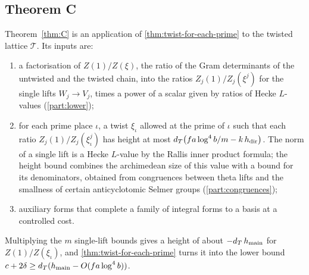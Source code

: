 \subsection{Theorem C}\label{ss:overview-C}
Theorem~\ref{thm:C} is an application of \cref{thm:twist-for-each-prime} to the twisted lattice
$\mathcal T$. Its inputs are:
\begin{enumerate}[label=\textup{(\roman*)}]
\item a factorisation of $Z(1)/Z(\xi)$, the ratio of the Gram determinants of the untwisted and the
twisted chain, into the ratios $Z_j(1)/Z_j(\xi^j)$ for the single lifts $W_j\to V_j$, times a power of a
scalar given by ratios of Hecke $L$-values (\cref{part:lower});
\item for each prime place $\iota$, a twist $\xi_\iota$ allowed at the prime of $\iota$ such that each
ratio $Z_j(1)/Z_j(\xi_\iota^j)$ has height at most $d_T\bigl(fa\log^4b/m-k\,h_{\mathrm{dir}}\bigr)$. The norm of
a single lift is a Hecke $L$-value by the Rallis inner product formula; the height bound combines the
archimedean size of this value with a bound for its denominators, obtained from congruences between
theta lifts and the smallness of certain anticyclotomic Selmer groups (\cref{part:congruences});
\item auxiliary forms that complete a family of integral forms to a basis at a controlled cost.
\end{enumerate}
Multiplying the $m$ single-lift bounds gives a height of about $-d_T\,h_{\mathrm{main}}$ for $Z(1)/Z(\xi_\iota)$,
and \cref{thm:twist-for-each-prime} turns it into the lower bound $c+2\delta\ge d_T(h_{\mathrm{main}}-O(fa\log^4b))$.

